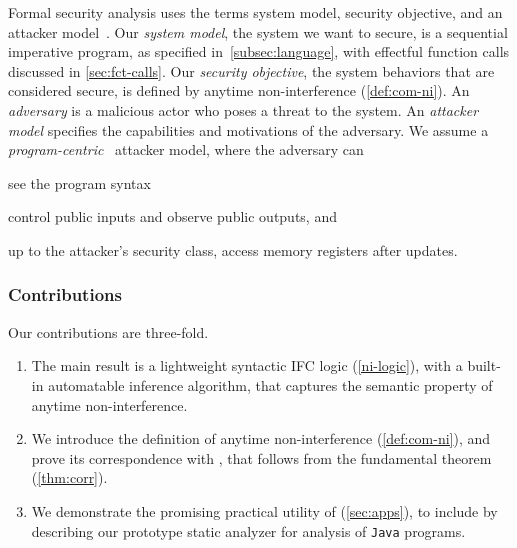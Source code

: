 Formal security analysis uses the terms system model, security objective, and an
attacker model~\cite{bau2011,bognar2022}.
Our \emph{system model}, \ie the
system we want to secure, is a sequential imperative program, as specified
in~\autoref{subsec:language}, with effectful function calls discussed in
\autoref{sec:fct-calls}. Our \emph{security objective},
\ie the system behaviors
that are considered secure, is defined by anytime non-interference
(\autoref{def:com-ni}). An \emph{adversary} is a malicious actor who poses a
threat to the system. An \emph{attacker model} specifies the capabilities and
motivations of the adversary. We assume a
\emph{program-centric}~\cite{hedin2012} attacker model, where the adversary can
\begin{enumerate*}[label=(\roman*)]
\item see the program syntax
\item control public inputs and observe public outputs, and
\item up to the attacker's security class, access memory registers after updates.
\end{enumerate*}

\subsubsection{Contributions}
Our contributions are three-fold.

\begin{enumerate}
\item The main result is a lightweight syntactic IFC logic \lname
(\autoref{ni-logic}), with a built-in automatable inference algorithm, that
captures the semantic property of anytime non-interference.

\item We introduce the definition of anytime non-interference
(\autoref{def:com-ni}), and prove its correspondence with \lname, that follows
from the fundamental theorem (\autoref{thm:corr}).

\item We demonstrate the promising practical utility of \lname
(\autoref{sec:apps}), to include by describing our prototype static analyzer
\tool for analysis of \texttt{Java} programs. \end{enumerate}

